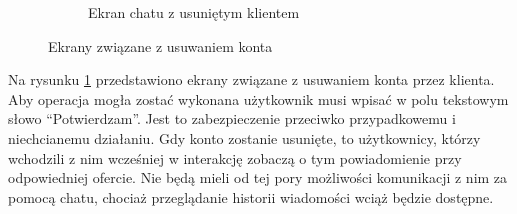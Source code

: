 \begin{figure}[ht]
\begin{subfigure}[t]{0.32\textwidth}
    \caption{Ekran chatu z usuniętym klientem}
  \end{subfigure}
  \caption{Ekrany związane z usuwaniem konta}
  \label{fig:delete}
\end{figure}

Na rysunku \ref{fig:delete} przedstawiono ekrany związane z usuwaniem konta przez klienta. Aby operacja mogła zostać wykonana użytkownik musi wpisać w polu tekstowym słowo \enquote{Potwierdzam}. Jest to zabezpieczenie przeciwko przypadkowemu i niechcianemu działaniu. Gdy konto zostanie usunięte, to użytkownicy, którzy wchodzili z nim wcześniej w interakcję zobaczą o tym powiadomienie przy odpowiedniej ofercie. Nie będą mieli od tej pory możliwości komunikacji z nim za pomocą chatu, chociaż przeglądanie historii wiadomości wciąż będzie dostępne.